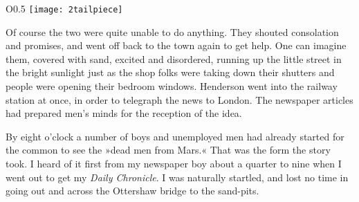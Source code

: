 \begin{wrapfigure}{O}{0.5\textwidth}
\centering
\texttt{[image: 2tailpiece]}
\end{wrapfigure}

Of course the two were quite unable to do anything. They shouted consolation and promises, and went off back to the town again to get help. One can imagine them, covered with sand, excited and disordered, running up the little street in the bright sunlight just as the shop folks were taking down their shutters and people were opening their bedroom windows. Henderson went into the railway station at once, in order to telegraph the news to London. The newspaper articles had prepared men's minds for the reception of the idea.

By eight o'clock a number of boys and unemployed men had already started for the common to see the »dead men from Mars.« That was the form the story took. I heard of it first from my newspaper boy about a quarter to nine when I went out to get my \textit{Daily Chronicle}. I was naturally startled, and lost no time in going out and across the Ottershaw bridge to the sand-pits.

